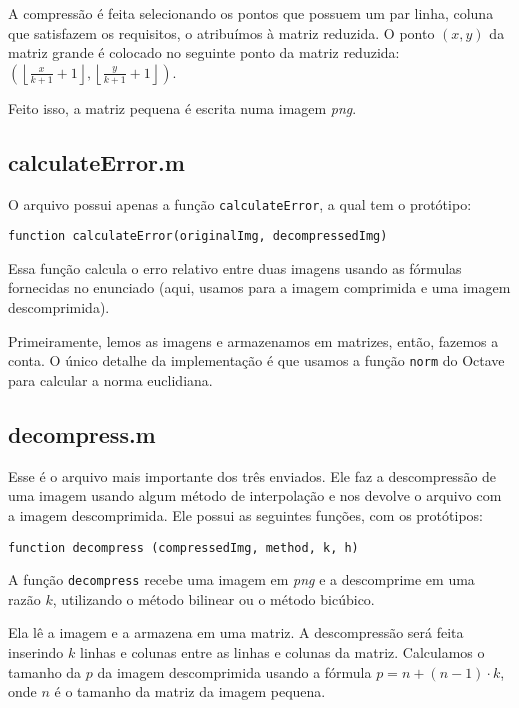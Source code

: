 \documentclass[12pt,letterpaper]{article}
\begin{document}
        A compressão é feita selecionando os pontos que possuem um par linha, coluna que satisfazem os requisitos, o atribuímos à matriz reduzida. O ponto $(x, y)$ da matriz grande é colocado no seguinte ponto da matriz reduzida:  $(\left \lfloor{\frac{x}{k+1}+1}\right \rfloor, \left \lfloor{\frac{y}{k+1}+1}\right \rfloor)$.

        Feito isso, a matriz pequena é escrita numa imagem \textit{png}.

        \subsection{calculateError.m}

        O arquivo possui apenas a função \texttt{calculateError}, a qual tem o protótipo:

        \begin{center}
            \texttt{function calculateError(originalImg, decompressedImg)}
        \end{center}

        Essa função calcula o erro relativo entre duas imagens usando as fórmulas fornecidas no enunciado (aqui, usamos para a imagem comprimida e uma imagem descomprimida).

        \clearpage

        Primeiramente, lemos as imagens e armazenamos em matrizes, então, fazemos a conta. O único detalhe da implementação é que usamos a função \texttt{norm} do Octave para calcular a norma euclidiana.

        \subsection{decompress.m}

        Esse é o arquivo mais importante dos três enviados. Ele faz a descompressão de uma imagem usando algum método de interpolação e nos devolve o arquivo com a imagem descomprimida. Ele possui as seguintes funções, com os protótipos:

        \begin{center}
            \texttt{function decompress (compressedImg, method, k, h)}
        \end{center}

        A função \texttt{decompress} recebe uma imagem em \textit{png} e a descomprime em uma razão $k$, utilizando o método bilinear ou o método bicúbico.

        Ela lê a imagem e a armazena em uma matriz. A descompressão será feita inserindo $k$ linhas e colunas entre as linhas e colunas da matriz. Calculamos o tamanho da $p$ da imagem descomprimida usando a fórmula $p = n+(n-1)\cdot k$, onde $n$ é o tamanho da matriz da imagem pequena.
\end{document}
